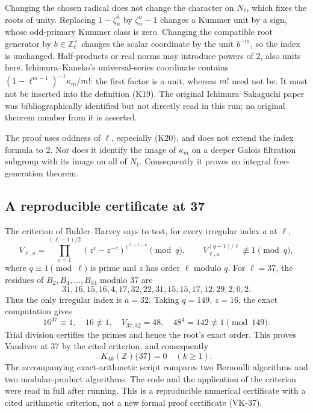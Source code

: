 Changing the chosen radical does not change the character
on \(N_\ell\), which fixes the roots of unity.
Replacing \(1-\zeta_n^a\) by \(\zeta_n^a-1\) changes a
Kummer unit by a sign, whose odd-primary Kummer class is
zero. Changing the compatible root generator by
\(b\in\mathbb Z_\ell^\times\) changes the scalar coordinate
by the unit \(b^{-m}\), so the index is unchanged.
Half-products or real norms may introduce powers of 2,
also units here. Ichimura--Kaneko's universal-series
coordinate \cite[\S1.1, pp.~313--314]{IchimuraKaneko1989}
contains \((1-\ell^{m-1})^{-1}\kappa_m/m!\):
the first factor is a unit, whereas \(m!\) need not be.
It must not be inserted into the definition (K19).
The original Ichimura--Sakaguchi paper was bibliographically
identified but not directly read in this run; no original
theorem number from it is asserted.

The proof uses oddness of \(\ell\), especially (K20), and
does not extend the index formula to 2. Nor does it
identify the image of \(\kappa_m\) on a deeper Galois
filtration subgroup with its image on all of \(N_\ell\).
Consequently it proves no integral free-generation theorem.

\subsection{A reproducible certificate at 37}

The criterion of Buhler--Harvey
\cite[\S4, author preprint pp.~4--5]{BuhlerHarvey2011}
says to test, for every irregular index \(a\) at \(\ell\),
\[
 V_{\ell,a}=
 \prod_{c=1}^{(\ell-1)/2}
   (z^c-z^{-c})^{c^{\ell-1-a}}\pmod q,\qquad
 V_{\ell,a}^{(q-1)/\ell}\not\equiv1\pmod q,           \tag{K21}
\]
where \(q\equiv1\pmod\ell\) is prime and \(z\) has order
\(\ell\) modulo \(q\).
For \(\ell=37\), the residues of
\(B_2,B_4,\ldots,B_{34}\) modulo 37 are
\[
31,16,15,16,4,17,32,22,31,15,15,17,12,29,2,0,2.
\]
Thus the only irregular index is \(a=32\).
Taking \(q=149\), \(z=16\), the exact computation gives
\[
 16^{37}\equiv1,\quad16\not\equiv1,\quad
 V_{37,32}=48,\quad48^4=142\not\equiv1\pmod{149}.
\]
Trial division certifies the primes and hence the root's
exact order. This proves Vandiver at 37 by the cited
criterion, and consequently
\[
 K_{4k}(\mathbb Z)\{37\}=0\quad(k\ge1).
\]
The accompanying exact-arithmetic script compares two
Bernoulli algorithms and two modular-product algorithms.
The code and the application of the criterion were read
in full after running. This is a reproducible numerical
certificate with a cited arithmetic criterion, not a new
formal proof certificate (VK-37).

